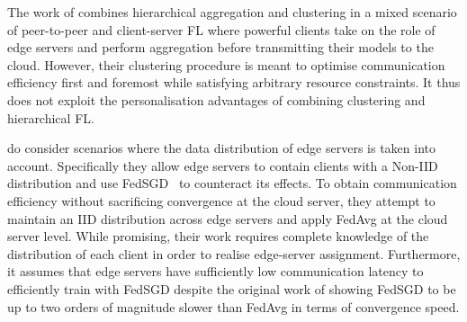 The work of \citet{ResourceEfficientHierAgg} combines hierarchical aggregation and clustering in a mixed scenario of peer-to-peer and client-server FL where powerful clients take on the role of edge servers and perform aggregation before transmitting their models to the cloud. However, their clustering procedure is meant to optimise communication efficiency first and foremost while satisfying arbitrary resource constraints. It thus does not exploit the personalisation advantages of combining clustering and hierarchical FL\@.

\citet{OptimalUserEdgeAssingmentHierFL} do consider scenarios where the data distribution of edge servers is taken into account. Specifically they allow edge servers to contain clients with a Non-IID distribution and use FedSGD~\citep{FedAvg} to counteract its effects. To obtain communication efficiency without sacrificing convergence at the cloud server, they attempt to maintain an IID distribution across edge servers and apply FedAvg at the cloud server level. While promising, their work requires complete knowledge of the distribution of each client in order to realise edge-server assignment. Furthermore, it assumes that edge servers have sufficiently low communication latency to efficiently train with FedSGD despite the original work of \citet{FedAvg} showing FedSGD to be up to two orders of magnitude slower than FedAvg in terms of convergence speed.




